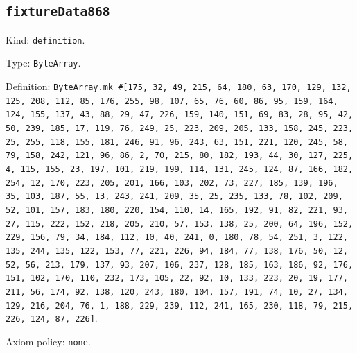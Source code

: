 \documentclass[11pt]{article}
\begin{document}
\subsection*{\texttt{fixtureData868}}
\noindent Kind: \texttt{definition}.\par
\noindent Type: \texttt{ByteArray}.\par
\noindent Definition: \texttt{ByteArray.mk \#[175, 32, 49, 215, 64, 180, 63, 170, 129, 132, 125, 208, 112, 85, 176, 255, 98, 107, 65, 76, 60, 86, 95, 159, 164, 124, 155, 137, 43, 88, 29, 47, 226, 159, 140, 151, 69, 83, 28, 95, 42, 50, 239, 185, 17, 119, 76, 249, 25, 223, 209, 205, 133, 158, 245, 223, 25, 255, 118, 155, 181, 246, 91, 96, 243, 63, 151, 221, 120, 245, 58, 79, 158, 242, 121, 96, 86, 2, 70, 215, 80, 182, 193, 44, 30, 127, 225, 4, 115, 155, 23, 197, 101, 219, 199, 114, 131, 245, 124, 87, 166, 182, 254, 12, 170, 223, 205, 201, 166, 103, 202, 73, 227, 185, 139, 196, 35, 103, 187, 55, 13, 243, 241, 209, 35, 25, 235, 133, 78, 102, 209, 52, 101, 157, 183, 180, 220, 154, 110, 14, 165, 192, 91, 82, 221, 93, 27, 115, 222, 152, 218, 205, 210, 57, 153, 138, 25, 200, 64, 196, 152, 229, 156, 79, 34, 184, 112, 10, 40, 241, 0, 180, 78, 54, 251, 3, 122, 135, 244, 135, 122, 153, 77, 221, 226, 94, 184, 77, 138, 176, 50, 12, 52, 56, 213, 179, 137, 93, 207, 106, 237, 128, 185, 163, 186, 92, 176, 151, 102, 170, 110, 232, 173, 105, 22, 92, 10, 133, 223, 20, 19, 177, 211, 56, 174, 92, 138, 120, 243, 180, 104, 157, 191, 74, 10, 27, 134, 129, 216, 204, 76, 1, 188, 229, 239, 112, 241, 165, 230, 118, 79, 215, 226, 124, 87, 226]}.\par
\noindent Axiom policy: \texttt{none}.\par
\end{document}
